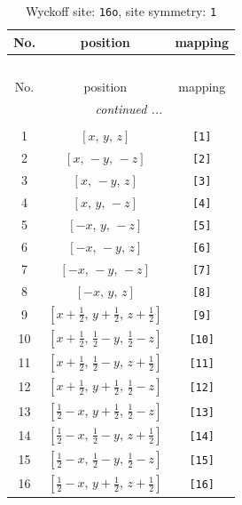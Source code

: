\documentclass[fleqn,8pt]{jsarticle}
\begin{document}
\begin{longtable}{ccc}
\caption{Wyckoff site: {\tt 16o}, site symmetry: {\tt 1}}
 \\
 \hline \hline
No. & position & mapping \\ \hline \endfirsthead

\multicolumn{2}{l}{\tablename\ \thetable{}} \\
 \hline \hline
No. & position & mapping \\ \hline \endhead

 \hline \hline
\multicolumn{2}{r}{\footnotesize\it continued ...} \\ \endfoot

 \hline \hline
\multicolumn{2}{r}{} \\ \endlastfoot

1 & $\left[ x,\, y,\, z \right]$ & {\tt [1]} \\ \hline
2 & $\left[ x,\, - y,\, - z \right]$ & {\tt [2]} \\ \hline
3 & $\left[ x,\, - y,\, z \right]$ & {\tt [3]} \\ \hline
4 & $\left[ x,\, y,\, - z \right]$ & {\tt [4]} \\ \hline
5 & $\left[ - x,\, y,\, - z \right]$ & {\tt [5]} \\ \hline
6 & $\left[ - x,\, - y,\, z \right]$ & {\tt [6]} \\ \hline
7 & $\left[ - x,\, - y,\, - z \right]$ & {\tt [7]} \\ \hline
8 & $\left[ - x,\, y,\, z \right]$ & {\tt [8]} \\ \hline
9 & $\left[ x + \frac{1}{2},\, y + \frac{1}{2},\, z + \frac{1}{2} \right]$ & {\tt [9]} \\ \hline
10 & $\left[ x + \frac{1}{2},\, \frac{1}{2} - y,\, \frac{1}{2} - z \right]$ & {\tt [10]} \\ \hline
11 & $\left[ x + \frac{1}{2},\, \frac{1}{2} - y,\, z + \frac{1}{2} \right]$ & {\tt [11]} \\ \hline
12 & $\left[ x + \frac{1}{2},\, y + \frac{1}{2},\, \frac{1}{2} - z \right]$ & {\tt [12]} \\ \hline
13 & $\left[ \frac{1}{2} - x,\, y + \frac{1}{2},\, \frac{1}{2} - z \right]$ & {\tt [13]} \\ \hline
14 & $\left[ \frac{1}{2} - x,\, \frac{1}{2} - y,\, z + \frac{1}{2} \right]$ & {\tt [14]} \\ \hline
15 & $\left[ \frac{1}{2} - x,\, \frac{1}{2} - y,\, \frac{1}{2} - z \right]$ & {\tt [15]} \\ \hline
16 & $\left[ \frac{1}{2} - x,\, y + \frac{1}{2},\, z + \frac{1}{2} \right]$ & {\tt [16]} \\
\end{longtable}
\end{document}
